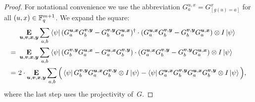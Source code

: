 \begin{proof}
	For notational convenience we use the abbreviation $G^{u,x}_a = G^{x}_{[g(u) = a]}$ for all $(u,x) \in \F_q^{m+1}$. 
We expand the square:
\begin{align}
	& \E_{\bu,\bv,\bx,\by} \sum_{a,b} \bra{\psi} ( G^{\bu,\bx}_a G^{\bv,\by}_b - G^{\bv,\by}_b G^{\bu,\bx}_a )^\dagger \cdot( G^{\bu,\bx}_a G^{\bv,\by}_b - G^{\bv,\by}_b G^{\bu,\bx}_a ) \ot I \ket{\psi} \nonumber\\
	=~& \E_{\bu,\bv,\bx,\by} \sum_{a,b} \bra{\psi} ( G^{\bv,\by}_b G^{\bu,\bx}_a  - G^{\bu,\bx}_a G^{\bv,\by}_b  ) \cdot( G^{\bu,\bx}_a G^{\bv,\by}_b - G^{\bv,\by}_b G^{\bu,\bx}_a ) \ot I \ket{\psi} \nonumber\\
	=~& 2\cdot \E_{\bu,\bv,\bx,\by} \sum_{a,b} \Big ( \bra{\psi} G^{\bv,\by}_b G^{\bu,\bx}_a G^{\bv,\by}_b \ot I \ket{\psi} -  \bra{\psi} G^{\bu,\bx}_a  G^{\bv,\by}_b G^{\bu,\bx}_a G^{\bv,\by}_b  \ot I \ket{\psi} \Big ),  \label{eq:gcom8}
\end{align}
where the last step uses the projectivity of~$G$.


\end{proof}
